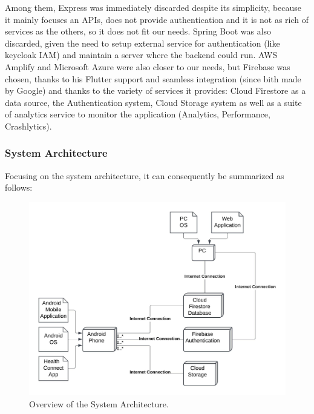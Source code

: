 \newpage
\noindent Among them, Express was immediately discarded despite its simplicity, because it mainly focuses an APIs, does not provide authentication and it is not as rich of services as the others, so it does not fit our needs. Spring Boot was also discarded, given the need to setup external service for authentication (like keycloak IAM) and maintain a server where the backend could run. AWS Amplify and Microsoft Azure were also closer to our needs, but Firebase was chosen, thanks to his Flutter support and seamless integration (since bith made by Google) and thanks to the variety of services it provides: Cloud Firestore as a data source, the Authentication system, Cloud Storage system as well as a suite of analytics service to monitor the application (Analytics, Performance, Crashlytics).
\subsubsection{System Architecture}

Focusing on the system architecture, it can consequently be summarized as follows:
\begin{figure}
    \includegraphics[width=1.0\linewidth]{./images/system_architecture.jpeg}
    \caption{Overview of the System Architecture.}
    \label{fig:systemArchitecture}
\end{figure}

